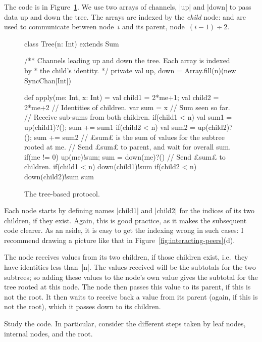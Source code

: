 
The code is in Figure~\ref{fig:sum-tree}.  We use two arrays of channels, |up|
and |down| to pass data up and down the tree.  The arrays are indexed by the
\emph{child} node:  and  are used to communicate
between node~$i$ and its parent, node~$(i-1) \div 2$.



\begin{figure}[tbhp]
\begin{scala}
class Tree(n: Int) extends Sum{
  /** Channels leading up and down the tree.  Each array is indexed by
    * the child's identity. */
  private val up, down = Array.fill(n)(new SyncChan[Int])
  
  def apply(me: Int, x: Int) = {
    val child1 = 2*me+1; val child2 = 2*me+2  // Identities of children.
    var sum = x                                     // Sum seen so far.
    // Receive sub-sums from both children.
    if(child1 < n){ val sum1 = up(child1)?(); sum += sum1 }
    if(child2 < n){ val sum2 = up(child2)?(); sum += sum2 }
    // £sum£ is the sum of values for the subtree rooted at me.
    // Send £sum£ to parent, and wait for overall sum.
    if(me != 0){ up(me)!sum; sum = down(me)?() }
    // Send £sum£ to children.
    if(child1 < n) down(child1)!sum
    if(child2 < n) down(child2)!sum
    sum
  }
}
\end{scala}
\caption{The tree-based protocol.}
\label{fig:sum-tree}
\end{figure}


Each node starts by defining names |child1| and |child2| for the indices of
its two children, if they exist.  Again, this is good practice, as it makes
the subsequent code clearer.  As an aside, it is easy to get the indexing
wrong in such cases: I recommend drawing a picture like that in
Figure~\ref{fig:interacting-peers}(d).  

The node receives values from its two
children, if those children exist, i.e.~they have identities less than~|n|.
The values received will be the subtotals for the two subtrees; so adding
these values to the node's own value gives the subtotal for the tree rooted at
this node.  The node then passes this value to its parent, if this is not the
root.  It then waits to receive back a value from its parent (again, if this
is not the root), which it passes down to its children.

\begin{instruction}
Study the code.  In particular, consider the different steps taken by leaf
nodes, internal nodes, and the root.
\end{instruction}

